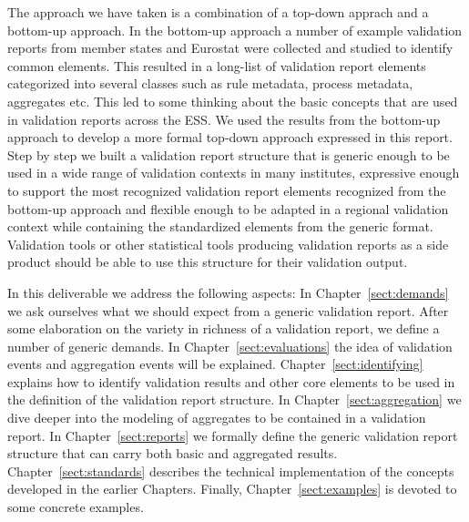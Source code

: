 The approach we have taken is a combination of a top-down apprach and a
bottom-up approach.  In the bottom-up approach a number of example validation
reports from member states and Eurostat were collected and studied to identify
common elements.  This resulted in a long-list of validation report elements
categorized into several classes such as rule metadata, process metadata,
aggregates etc.  This led to some thinking about the basic concepts that are
used in validation reports across the ESS.  We used the results from the
bottom-up approach to develop a more formal top-down approach expressed in this
report.  Step by step we built a validation report structure that is generic
enough to be used in a wide range of validation contexts in many institutes,
expressive enough to support the most recognized validation report elements
recognized from the bottom-up approach and flexible enough to be adapted in a
regional validation context while containing the standardized elements from the
generic format.  Validation tools or other statistical tools producing
validation reports as a side product should be able to use this structure for
their validation output.

In this deliverable we address the following aspects: In
Chapter~\ref{sect:demands} we ask ourselves what we should expect from a
generic validation report.  After some elaboration on the variety in richness
of a validation report, we define a number of generic demands. In
Chapter~\ref{sect:evaluations} the idea of validation events and 
aggregation events will be explained.
Chapter~\ref{sect:identifying} explains how to identify validation results
and other core elements to be used in the
definition of the validation report structure.
In Chapter~\ref{sect:aggregation} we dive deeper into the modeling of aggregates
to be contained in a validation report.
In Chapter~\ref{sect:reports} we formally define the generic validation report 
structure that can carry both basic and aggregated results.
Chapter~\ref{sect:standards} describes the technical implementation of the
concepts developed in the earlier Chapters.  Finally,
Chapter~\ref{sect:examples} is devoted to some concrete examples.


